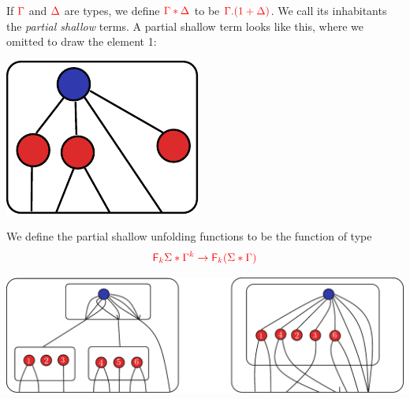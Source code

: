 \noindent\begin{example} If ${\color{red}{\Gamma}}$ and ${\color{red}{\Delta}}$ are types, we define ${\color{red}{\Gamma*\Delta}}$ to be ${\color{red}{\Gamma.(1+\Delta)}}$. We call its inhabitants the \emph{partial shallow} terms. A partial shallow term looks like this, where we omitted to draw the element 1:
\begin{center}
\includegraphics[scale=.4]{partial-shallow-term.pdf}
\end{center}
We define the partial shallow unfolding functions to be the function of type
\begin{align*}
{\color{red}{{{\color{red}{\mathsf F_{k}}}\Sigma}*{\Gamma^k} \to {\color{red}{\mathsf F_{k}}}({\Sigma}*{\Gamma})}} 
\end{align*}
 \begin{center}
\includegraphics[scale=.4]{partial-shallow-unfold.pdf}
 \end{center}
\end{example}

